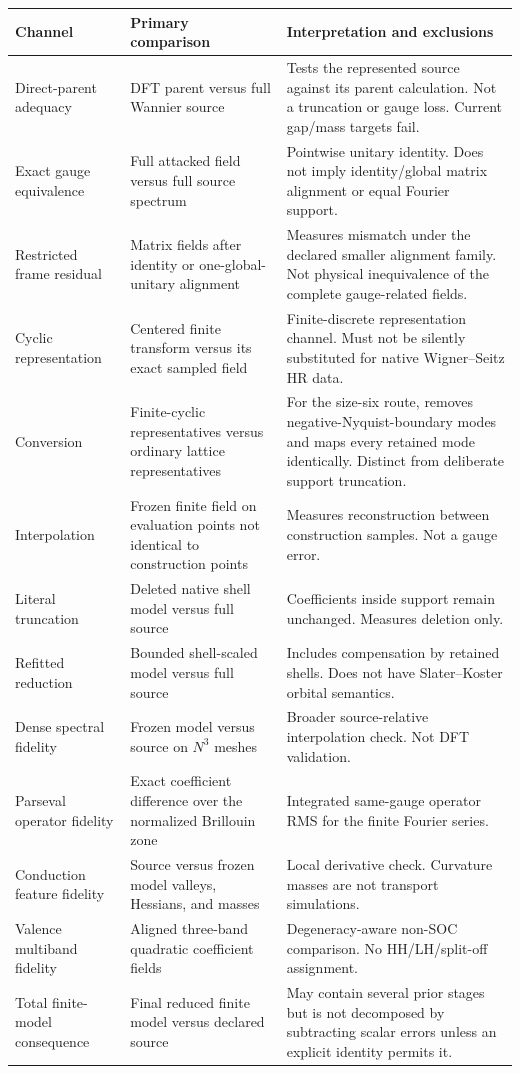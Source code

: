 \documentclass[11pt]{article}
\theoremstyle{definition}
\begin{document}
\begin{longtable}{@{}p{}p{}p{}@{}}
\toprule
Channel & Primary comparison & Interpretation and exclusions\\
\midrule
Direct-parent adequacy
& DFT parent versus full Wannier source
& Tests the represented source against its parent calculation.  Not a truncation or
 gauge loss.  Current gap/mass targets fail.\\
Exact gauge equivalence
& Full attacked field versus full source spectrum
& Pointwise unitary identity.  Does not imply identity/global matrix alignment or equal
 Fourier support.\\
Restricted frame residual
& Matrix fields after identity or one-global-unitary alignment
& Measures mismatch under the declared smaller alignment family.  Not physical
 inequivalence of the complete gauge-related fields.\\
Cyclic representation
& Centered finite transform versus its exact sampled field
& Finite-discrete representation channel.  Must not be silently substituted for native
 Wigner--Seitz HR data.\\
Conversion
& Finite-cyclic representatives versus ordinary lattice representatives
& For the size-six route, removes negative-Nyquist-boundary modes and maps every retained mode identically.  Distinct from deliberate support truncation.\\
Interpolation
& Frozen finite field on evaluation points not identical to construction points
& Measures reconstruction between construction samples.  Not a gauge error.\\
Literal truncation
& Deleted native shell model versus full source
& Coefficients inside support remain unchanged.  Measures deletion only.\\
Refitted reduction
& Bounded shell-scaled model versus full source
& Includes compensation by retained shells.  Does not have Slater--Koster orbital
 semantics.\\
Dense spectral fidelity
& Frozen model versus source on $N^3$ meshes
& Broader source-relative interpolation check.  Not DFT validation.\\
Parseval operator fidelity
& Exact coefficient difference over the normalized Brillouin zone
& Integrated same-gauge operator RMS for the finite Fourier series.\\
Conduction feature fidelity
& Source versus frozen model valleys, Hessians, and masses
& Local derivative check.  Curvature masses are not transport simulations.\\
Valence multiband fidelity
& Aligned three-band quadratic coefficient fields
& Degeneracy-aware non-SOC comparison.  No HH/LH/split-off assignment.\\
Total finite-model consequence
& Final reduced finite model versus declared source
& May contain several prior stages but is not decomposed by subtracting scalar errors
 unless an explicit identity permits it.\\
\bottomrule
\end{longtable}
\end{document}
